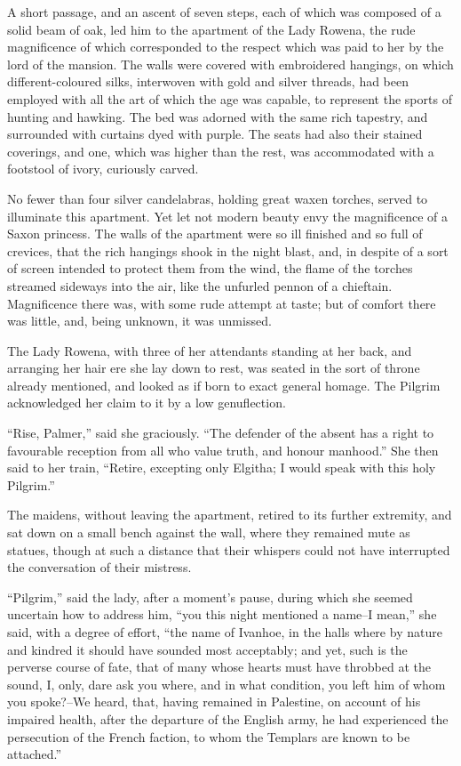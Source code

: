 A short passage, and an ascent of seven steps, each of which was
composed of a solid beam of oak, led him to the apartment of the Lady
Rowena, the rude magnificence of which corresponded to the respect which
was paid to her by the lord of the mansion. The walls were covered with
embroidered hangings, on which different-coloured silks, interwoven with
gold and silver threads, had been employed with all the art of which the
age was capable, to represent the sports of hunting and hawking. The bed
was adorned with the same rich tapestry, and surrounded with curtains
dyed with purple. The seats had also their stained coverings, and one,
which was higher than the rest, was accommodated with a footstool of
ivory, curiously carved.

No fewer than four silver candelabras, holding great waxen torches,
served to illuminate this apartment. Yet let not modern beauty envy the
magnificence of a Saxon princess. The walls of the apartment were so ill
finished and so full of crevices, that the rich hangings shook in the
night blast, and, in despite of a sort of screen intended to protect
them from the wind, the flame of the torches streamed sideways into the
air, like the unfurled pennon of a chieftain. Magnificence there was,
with some rude attempt at taste; but of comfort there was little, and,
being unknown, it was unmissed.

The Lady Rowena, with three of her attendants standing at her back, and
arranging her hair ere she lay down to rest, was seated in the sort of
throne already mentioned, and looked as if born to exact general homage.
The Pilgrim acknowledged her claim to it by a low genuflection.

``Rise, Palmer,'' said she graciously. ``The defender of the absent has
a right to favourable reception from all who value truth, and honour
manhood.'' She then said to her train, ``Retire, excepting only Elgitha;
I would speak with this holy Pilgrim.''

The maidens, without leaving the apartment, retired to its further
extremity, and sat down on a small bench against the wall, where they
remained mute as statues, though at such a distance that their whispers
could not have interrupted the conversation of their mistress.

``Pilgrim,'' said the lady, after a moment's pause, during which she
seemed uncertain how to address him, ``you this night mentioned a
name--I mean,'' she said, with a degree of effort, ``the name of
Ivanhoe, in the halls where by nature and kindred it should have sounded
most acceptably; and yet, such is the perverse course of fate, that of
many whose hearts must have throbbed at the sound, I, only, dare ask you
where, and in what condition, you left him of whom you spoke?--We heard,
that, having remained in Palestine, on account of his impaired health,
after the departure of the English army, he had experienced the
persecution of the French faction, to whom the Templars are known to be
attached.''

